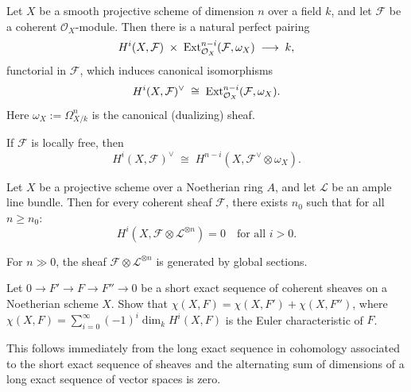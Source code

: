 \documentclass[12pt]{article}
\begin{document}
\begin{theorem}
    Let $X$ be a smooth projective scheme of dimension $n$ over a field $k$, and let $\mathcal F$ be a coherent $\mathcal O_X$-module. Then there is a natural perfect pairing
    \[
        H^i(X,\mathcal F) \;\times\; \operatorname{Ext}^{n-i}_{\mathcal O_X}(\mathcal F,\omega_X)
        \;\longrightarrow\; k,
    \]
    functorial in $\mathcal F$, which induces canonical isomorphisms
    \[
        H^i(X,\mathcal F)^\vee \;\cong\;
        \operatorname{Ext}^{n-i}_{\mathcal O_X}(\mathcal F,\omega_X).
    \]
    Here $\omega_X := \Omega^n_{X/k}$ is the canonical (dualizing) sheaf.
\end{theorem}

\begin{corollary}
    If $\mathcal F$ is locally free, then
    \[
        H^i(X,\mathcal F)^\vee
        \;\cong\;
        H^{n-i}(X,\mathcal F^\vee \otimes \omega_X).
    \]
\end{corollary}


\begin{theorem}
    Let $X$ be a projective scheme over a Noetherian ring $A$, and let $\mathcal L$ be an ample line bundle. Then for every coherent sheaf $\mathcal F$, there exists $n_0$ such that for all $n\ge n_0$:
    \[
        H^i(X,\mathcal F\otimes \mathcal L^{\otimes n}) = 0
        \quad \text{for all } i>0.
    \]
\end{theorem}

\begin{corollary}
    For $n\gg 0$, the sheaf $\mathcal F\otimes \mathcal L^{\otimes n}$ is generated by global sections.
\end{corollary}


\begin{exercise}
    Let $0 \to F' \to F \to F'' \to 0$ be a short exact sequence of coherent sheaves on a Noetherian scheme $X$. Show that $\chi(X,F) = \chi(X,F') + \chi(X,F'')$, where $\chi(X,F) = \sum_{i=0}^\infty (-1)^i \dim_k H^i(X,F)$ is the Euler characteristic of $F$.
\end{exercise}

\begin{solution}
    This follows immediately from the long exact sequence in cohomology associated to the short exact sequence of sheaves and the alternating sum of dimensions of a long exact sequence of vector spaces is zero.
\end{solution}
\end{document}
